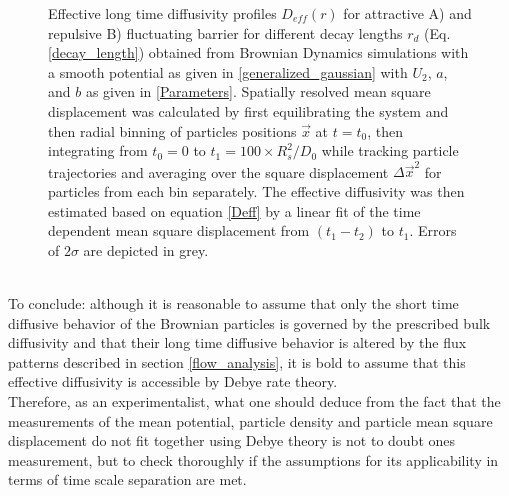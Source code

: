 \begin{minipage}[t]{.37 \textwidth}
    \begin{figure}[H]
    \caption{Effective long time diffusivity profiles $D_{eff}(r)$ for attractive A) and repulsive B) fluctuating barrier for different decay lengths $r_d$ (Eq. \eqref{decay_length}) obtained from Brownian Dynamics simulations with a smooth potential as given in \eqref{generalized_gaussian} with $U_2$, $a$, and $b$ as given in \eqref{Parameters}. Spatially resolved mean square displacement was calculated by first equilibrating the system and then radial binning of particles positions $\vec{x}$ at $t = t_0$, then integrating from $t_0 = 0$ to $t_1 = 100 \times R_s^2/D_0$ while tracking particle trajectories and averaging over the square displacement $\Delta \vec{x}^{2}$ for particles from each bin separately. The effective diffusivity was then estimated based on equation \eqref{Deff} by a linear fit of the time dependent mean square displacement from $(t_1-t_2)$ to $t_1$. Errors of $2 \sigma$ are depicted in grey.\label{DeffBDLong}}
    \end{figure}
  \end{minipage}
\vspace{0.3 cm}\\
To conclude: although it is reasonable to assume that only the short time diffusive behavior of the Brownian particles is governed by the prescribed bulk diffusivity and that their long time diffusive behavior is altered by the flux patterns described in section \ref{flow_analysis}, it is bold to assume that this effective diffusivity is accessible by Debye rate theory.\\
Therefore, as an experimentalist, what one should deduce from the fact that the measurements of the mean potential, particle density and particle mean square displacement do not fit together using Debye theory is not to doubt ones measurement, but to check thoroughly if the assumptions for its applicability in terms of time scale separation are met.
